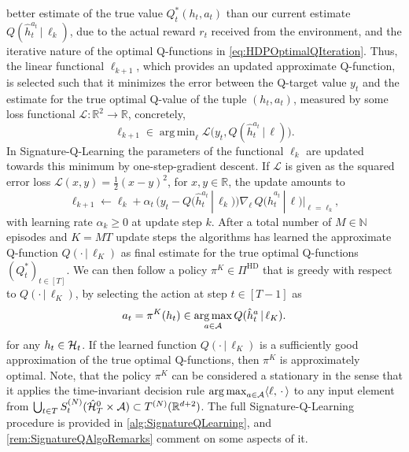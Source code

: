 \documentclass[
    a4paper,
    11pt,
    bibliography=totoc,
    listof=totoc,      
    headinclude=true,
    cleardoublepage=empty,
]{scrbook}
\theoremstyle{plain}
\theoremstyle{definition}
\theoremstyle{remark}
\newcommand{\SetR}{\mathbb R}
\newcommand{\SetN}{\mathbb N}
\newcommand{\SpaceA}{{\cal A}}
\newcommand{\SpaceH}{{\cal H}}
\DeclareMathOperator*{\argmin}{arg\,min}
\DeclareMathOperator*{\argmax}{arg\,max}
\begin{document}
better estimate of the true value $Q^*_t(h_t,a_t)$ than our current estimate 
$Q(\hat h_t^{a_t}\,|\,\ell_k)$, due to the actual reward $r_t$ received from the 
environment, and the iterative nature of the optimal Q-functions in \eqref{eq:HDPOptimalQIteration}. 
Thus, the linear functional $\ell_{k+1}$, which provides an updated approximate Q-function, is selected such that it minimizes the error between the Q-target value $y_t$ and the estimate for the true optimal Q-value of the tuple $(h_t,a_t)$, measured by some loss functional $\mathcal{L}:
\SetR^2\to\SetR$, concretely,
\[
    \ell_{k+1} \in \argmin_{\ell}\mathcal{L}\bigl(y_t, Q(\hat h_t^{a_t} \,|\,\ell)\bigr).
\]
In Signature-Q-Learning the parameters of the functional $\ell_k$ are updated towards 
this minimum by one-step-gradient descent. If $\mathcal{L}$ is 
given as the squared error loss $\mathcal{L}(x,y)=\tfrac{1}{2}(x-y)^2$, for 
$x,y\in\SetR$, the update amounts to
\begin{equation}
\label{eq:HDPQApproxUpdate}
    \ell_{k+1} \gets \ell_k + \alpha_t \,
    \Big(y_t - Q\bigl(\hat{h}^{a_t}_t \,|\, \ell_k\bigr)\Big)
    \nabla_{\ell}\, Q\bigl(\hat{h}^{a_t}_t \,|\, \ell\bigr)\Big|_{\ell=\ell_k},
\end{equation}
with learning rate $\alpha_k \geq 0$ at update step $k$. After a total number of 
$M\in\SetN$ episodes and $K=MT$ update steps the algorithms has learned the 
approximate Q-function $Q(\cdot\,|\,\ell_K)$ as final estimate for the true 
optimal Q-functions $(Q^*_t)_{t\in[T]}$. We can then follow a policy 
$\pi^K\in\Pi^\text{HD}$ that is greedy with respect to $Q(\cdot\,|\,\ell_K)$, 
by selecting the action at step $t\in[T-1]$ as 
\begin{equation}
\label{eq:GreedyApproxQFunction}
    a_t = \pi^K(h_t)\in\argmax_{a\in\SpaceA} Q(\hat h^a_t\,|\,\ell_K).    
\end{equation}
for any $h_t\in\SpaceH_t$. If the learned function $Q(\cdot\,|\,\ell_K)$ is a 
sufficiently good approximation of the true optimal Q-functions, then $\pi^K$ 
is approximately optimal. Note, that the policy $\pi^K$ can be considered a 
stationary in the sense that it applies the time-invariant decision rule 
$\argmax_{a\in\SpaceA} \langle \ell, \,\cdot\, \rangle$ to any input element
from $\bigcup_{t\in T}S^{(N)}_t(\hat \SpaceH^0_T\times\SpaceA) \subset T^{(N)}
(\SetR^{d+2})$. The full Signature-Q-Learning procedure is provided in 
\cref{alg:SignatureQLearning}, and \cref{rem:SignatureQAlgoRemarks} comment 
on some aspects of it.

\end{document}
